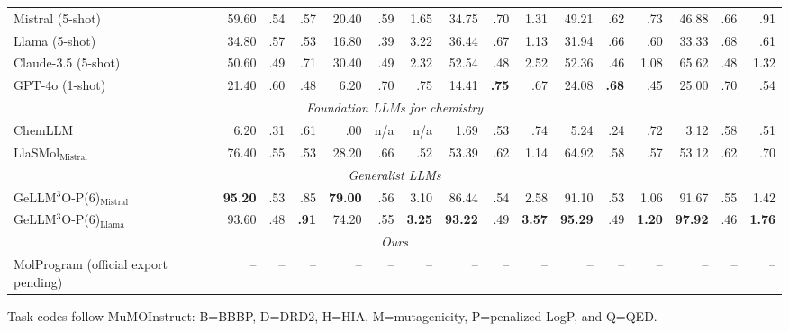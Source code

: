 \begin{table}[t]
{\begin{tabular}{lrrrrrrrrrrrrrrr}
    Mistral (5-shot) & 59.60 & .54 & .57 & 20.40 & .59 & 1.65 & 34.75 & .70 & 1.31 & 49.21 & .62 & .73 & 46.88 & .66 & .91 \\
    Llama (5-shot) & 34.80 & .57 & .53 & 16.80 & .39 & 3.22 & 36.44 & .67 & 1.13 & 31.94 & .66 & .60 & 33.33 & .68 & .61 \\
    Claude-3.5 (5-shot) & 50.60 & .49 & .71 & 30.40 & .49 & 2.32 & 52.54 & .48 & 2.52 & 52.36 & .46 & 1.08 & 65.62 & .48 & 1.32 \\
    GPT-4o (1-shot) & 21.40 & .60 & .48 & 6.20 & .70 & .75 & 14.41 & \textbf{.75} & .67 & 24.08 & \textbf{.68} & .45 & 25.00 & .70 & .54 \\
    \midrule
    \multicolumn{16}{c}{\textit{Foundation LLMs for chemistry}} \\
    ChemLLM & 6.20 & .31 & .61 & .00 & n/a & n/a & 1.69 & .53 & .74 & 5.24 & .24 & .72 & 3.12 & .58 & .51 \\
    LlaSMol$_{\mathrm{Mistral}}$ & 76.40 & .55 & .53 & 28.20 & .66 & .52 & 53.39 & .62 & 1.14 & 64.92 & .58 & .57 & 53.12 & .62 & .70 \\
    \midrule
    \multicolumn{16}{c}{\textit{Generalist LLMs}} \\
    GeLLM$^3$O-P(6)$_{\mathrm{Mistral}}$ & \textbf{95.20} & .53 & .85 & \textbf{79.00} & .56 & 3.10 & 86.44 & .54 & 2.58 & 91.10 & .53 & 1.06 & 91.67 & .55 & 1.42 \\
    GeLLM$^3$O-P(6)$_{\mathrm{Llama}}$ & 93.60 & .48 & \textbf{.91} & 74.20 & .55 & \textbf{3.25} & \textbf{93.22} & .49 & \textbf{3.57} & \textbf{95.29} & .49 & \textbf{1.20} & \textbf{97.92} & .46 & \textbf{1.76} \\
    \midrule
    \multicolumn{16}{c}{\textit{Ours}} \\
    MolProgram (official export pending) & -- & -- & -- & -- & -- & -- & -- & -- & -- & -- & -- & -- & -- & -- & -- \\
    \bottomrule
  \end{tabular}}
  \vspace{2pt}
  \parbox{\textwidth}{\scriptsize Task codes follow MuMOInstruct:
  B=BBBP, D=DRD2, H=HIA, M=mutagenicity, P=penalized LogP, and Q=QED.}
\end{table}

